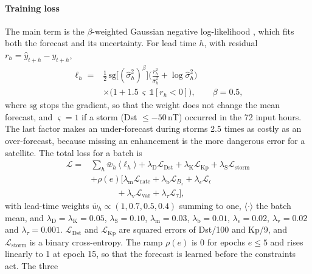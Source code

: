 \documentclass[a4paper,fleqn]{cas-dc}
\begin{document}
\paragraph{Training loss} The main term is the \(\beta\)-weighted Gaussian negative log-likelihood
\citep{seitzer2022}, which fits both the forecast and its uncertainty. For lead time \(h\), with residual
\(r_h=\hat y_{t+h}-y_{t+h}\),
\begin{equation}
\begin{aligned}
\ell_h={}&\tfrac12\,\mathrm{sg}\big[(\hat\sigma^2_h)^{\beta}\big]\Big(\frac{r_h^2}{\hat\sigma^2_h}+\log\hat\sigma^2_h\Big)\\
&\times\big(1+1.5\,\varsigma\,\mathbb 1[r_h<0]\big),\qquad\beta=0.5,
\end{aligned} \label{eq:bnll}
\end{equation}
where \(\mathrm{sg}\) stops the gradient, so that the weight does not change the mean forecast, and
\(\varsigma=1\) if a storm (Dst \(\le-50\)\,nT) occurred in the 72 input hours. The last factor makes an
under-forecast during storms 2.5 times as costly as an over-forecast, because missing an enhancement is the more
dangerous error for a satellite. The total loss for a batch is
\begin{equation}
\begin{aligned}
\mathcal L={}&\textstyle\sum_{h}\bar w_h\,\langle\ell_h\rangle+\lambda_{\mathrm{D}}\mathcal L_{\mathrm{Dst}}
+\lambda_{\mathrm K}\mathcal L_{\mathrm{Kp}}+\lambda_{\mathrm S}\mathcal L_{\mathrm{storm}}\\
&+\rho(e)\big[\lambda_{\mathrm m}\mathcal L_{\mathrm{rate}}+\lambda_{\mathrm b}\mathcal L_{B_z}
+\lambda_\epsilon\mathcal L_\epsilon\\
&\qquad\quad+\lambda_{\mathrm v}\mathcal L_{\mathrm{var}}+\lambda_\tau\mathcal L_\tau\big],
\end{aligned} \label{eq:loss}
\end{equation}
with lead-time weights \(\bar w_h\propto(1,0.7,0.5,0.4)\) summing to one, \(\langle\cdot\rangle\) the batch mean,
and \(\lambda_{\mathrm D}=\lambda_{\mathrm K}=0.05\), \(\lambda_{\mathrm S}=0.10\), \(\lambda_{\mathrm m}=0.03\),
\(\lambda_{\mathrm b}=0.01\), \(\lambda_\epsilon=0.02\), \(\lambda_{\mathrm v}=0.02\) and \(\lambda_\tau=0.001\).
\(\mathcal L_{\mathrm{Dst}}\) and \(\mathcal L_{\mathrm{Kp}}\) are squared errors of Dst/100 and Kp/9, and
\(\mathcal L_{\mathrm{storm}}\) is a binary cross-entropy. The ramp \(\rho(e)\) is 0 for epochs \(e\le5\) and
rises linearly to 1 at epoch 15, so that the forecast is learned before the constraints act. The three
\end{document}
